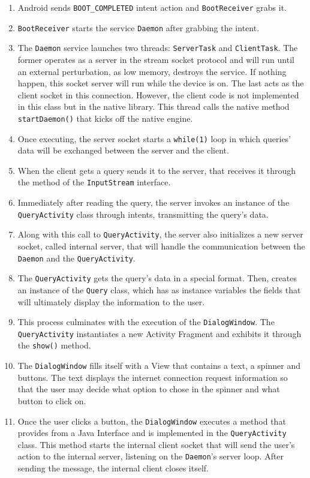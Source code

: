 \begin{enumerate}
\item Android sends \texttt{BOOT\_COMPLETED} intent action and \texttt{BootReceiver} grabs it.
\item \texttt{BootReceiver} starts the service \texttt{Daemon} after grabbing the intent.
\item The \texttt{Daemon} service launches two threads: \texttt{ServerTask} and \texttt{ClientTask}. The former operates as a server in the stream socket protocol and will run until an external perturbation, as low memory, destroys the service. If nothing happen, this socket server will run while the device is on. The last acts as the client socket in this connection. However, the client code is not implemented in this class but in the native library. This thread calls the native method \texttt{startDaemon()} that kicks off the native engine.
\item Once executing, the server socket starts a \texttt{while(1)} loop in which queries' data will be exchanged between the server and the client.
\item When the client gets a query sends it to the server, that receives it through the  method of the \texttt{InputStream} interface.
\item Immediately after reading the query, the server invokes an instance of the \texttt{QueryActivity} class through intents, transmitting the query's data.
\item Along with this call to \texttt{QueryActivity}, the server also initializes a new server socket, called internal server, that will handle the communication between the \texttt{Daemon} and the \texttt{QueryActivity}.
\item The \texttt{QueryActivity} gets the query's data in a special format. Then, creates an instance of the \texttt{Query} class, which has as instance variables the fields that will ultimately display the information to the user.
\item This process culminates with the execution of the \texttt{DialogWindow}. The \texttt{QueryActivity} instantiates a new Activity Fragment and exhibits it through the \texttt{show()} method.
\item The \texttt{DialogWindow} fills itself with a View that contains a text, a spinner and buttons. The text displays the internet connection request information so that the user may decide what option to chose in the spinner and what button to click on.
\item Once the user clicks a button, the \texttt{DialogWindow} executes a method that provides from a Java Interface and is implemented in the \texttt{QueryActivity} class. This method starts the internal client socket that will send the user's action to the internal server, listening on the \texttt{Daemon}'s server loop. After sending the message, the internal client closes itself.

\end{enumerate}
